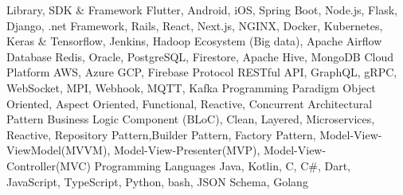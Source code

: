 
\horizontalLineRight

\skillItem
    {Library, SDK \& Framework}
    {Flutter, Android, iOS, Spring Boot, Node.js, Flask,
        Django, .net Framework, Rails,
        React, Next.js, NGINX, Docker, Kubernetes, Keras \& Tensorflow,
        Jenkins, Hadoop Ecosystem (Big data), Apache Airflow}
\skillItem
    {Database}
    {Redis, Oracle, PostgreSQL, Firestore, Apache Hive, MongoDB}
\skillItem
    {Cloud Platform}
    {AWS, Azure GCP, Firebase}
\skillItem
    {Protocol}
    {RESTful API, GraphQL, gRPC, WebSocket, MPI, Webhook, MQTT, Kafka}
\skillItem
    {Programming Paradigm}
    {Object Oriented, Aspect Oriented, Functional, Reactive, Concurrent}
\skillItem
    {Architectural Pattern}
    {Business Logic Component (BLoC), Clean, Layered, Microservices, Reactive, Repository Pattern,Builder Pattern,
        Factory Pattern, Model-View-ViewModel(MVVM), Model-View-Presenter(MVP), Model-View-Controller(MVC)}
\skillItem
    {Programming Languages}
    {Java, Kotlin, C, C\#, Dart, JavaScript, TypeScript, Python, bash, JSON Schema, Golang}